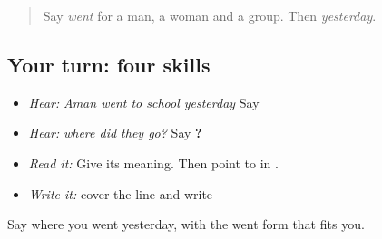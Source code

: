 \label{lesson:PA-C216-payoff}



\begin{quote}
Say \emph{went} for a man, a woman and a group. Then \emph{yesterday}.
\end{quote}

\subsection*{Your turn: four skills}
\begin{itemize}
\raggedright
  \item \emph{Hear:} \emph{Aman went to school yesterday} Say \textbf{   }
  \item \emph{Hear:} \emph{where did they go?} Say \textbf{  ?}
  \item \emph{Read it:} \textbf{   } Give its meaning. Then point to \textbf{} in \textbf{}.
  \item \emph{Write it:} cover the line and write \textbf{   }
\end{itemize}

\begin{tcolorbox}[breakable,colback=teal!4,colframe=teal!35!black,title={Before you move on}]
Say where you went yesterday, with the went form that fits you.
\end{tcolorbox}
